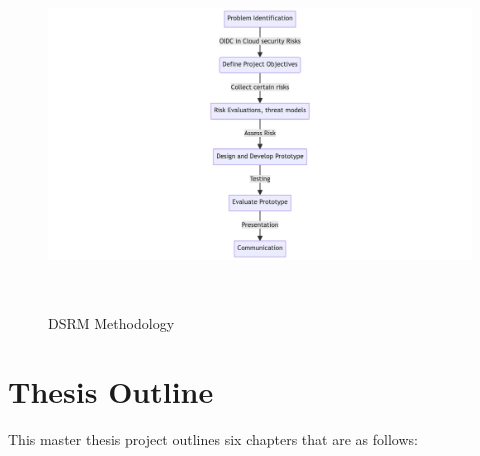 \begin{figure}[h!]
\centering
\label{fig:dsrm}
\includegraphics[width=\textwidth, height=350px]{pics/dsrm.png}
\caption{DSRM Methodology}
\end{figure}

\section{Thesis Outline}

This master thesis project outlines six chapters that are as follows:

